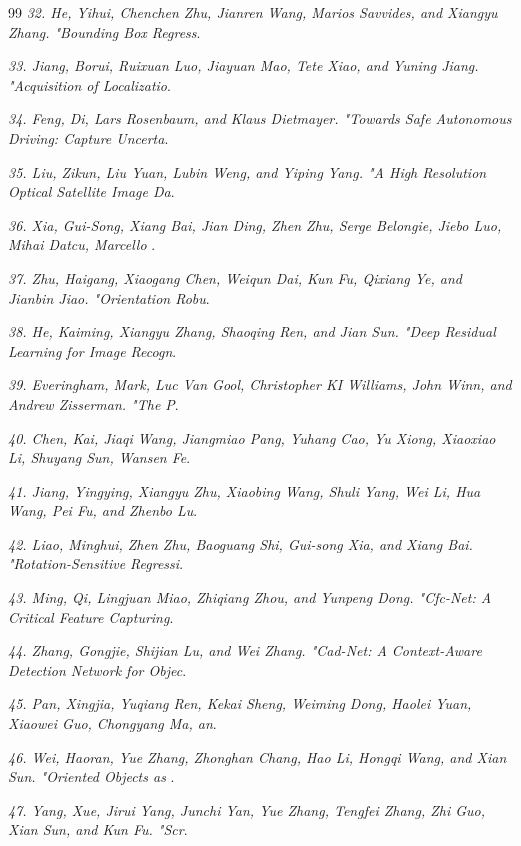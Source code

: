 \documentclass[journal]{IEEEtran}
\begin{document}
\begin{thebibliography}{99}
\textit{32.	He, Yihui, Chenchen Zhu, Jianren Wang, Marios Savvides, and Xiangyu Zhang. "Bounding Box Regress}.

\textit{33.	Jiang, Borui, Ruixuan Luo, Jiayuan Mao, Tete Xiao, and Yuning Jiang. "Acquisition of Localizatio}.

\textit{34.	Feng, Di, Lars Rosenbaum, and Klaus Dietmayer. "Towards Safe Autonomous Driving: Capture Uncerta}.

\textit{35.	Liu, Zikun, Liu Yuan, Lubin Weng, and Yiping Yang. "A High Resolution Optical Satellite Image Da}.

\textit{36.	Xia, Gui-Song, Xiang Bai, Jian Ding, Zhen Zhu, Serge Belongie, Jiebo Luo, Mihai Datcu, Marcello }.

\textit{37.	Zhu, Haigang, Xiaogang Chen, Weiqun Dai, Kun Fu, Qixiang Ye, and Jianbin Jiao. "Orientation Robu}.

\textit{38.	He, Kaiming, Xiangyu Zhang, Shaoqing Ren, and Jian Sun. "Deep Residual Learning for Image Recogn}.

\textit{39.	Everingham, Mark, Luc Van Gool, Christopher KI Williams, John Winn, and Andrew Zisserman. "The P}.

\textit{40.	Chen, Kai, Jiaqi Wang, Jiangmiao Pang, Yuhang Cao, Yu Xiong, Xiaoxiao Li, Shuyang Sun, Wansen Fe}.

\textit{41.	Jiang, Yingying, Xiangyu Zhu, Xiaobing Wang, Shuli Yang, Wei Li, Hua Wang, Pei Fu, and Zhenbo Lu}.

\textit{42.	Liao, Minghui, Zhen Zhu, Baoguang Shi, Gui-song Xia, and Xiang Bai. "Rotation-Sensitive Regressi}.

\textit{43.	Ming, Qi, Lingjuan Miao, Zhiqiang Zhou, and Yunpeng Dong. "Cfc-Net: A Critical Feature Capturing}.

\textit{44.	Zhang, Gongjie, Shijian Lu, and Wei Zhang. "Cad-Net: A Context-Aware Detection Network for Objec}.

\textit{45.	Pan, Xingjia, Yuqiang Ren, Kekai Sheng, Weiming Dong, Haolei Yuan, Xiaowei Guo, Chongyang Ma, an}.

\textit{46.	Wei, Haoran, Yue Zhang, Zhonghan Chang, Hao Li, Hongqi Wang, and Xian Sun. "Oriented Objects as }.

\textit{47.	Yang, Xue, Jirui Yang, Junchi Yan, Yue Zhang, Tengfei Zhang, Zhi Guo, Xian Sun, and Kun Fu. "Scr}.


\end{thebibliography}
\end{document}
